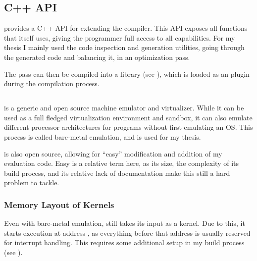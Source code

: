 


\subsection{\llvm{} C++ API}
\label{api}
\llvm{} provides a C++ API for extending the compiler.
This API exposes all functions that \llvm{} itself uses, giving the programmer full access to all capabilities.
For my thesis I mainly used the code inspection and generation utilities, going through the generated \ir{} code and balancing it, in an optimization pass.

The pass can then be compiled into a library (see ), which is loaded as an \llvm{} plugin during the compilation process.

\subsection{\qemu{}}
\label{qemu}
\qemu{} is a generic and open source machine emulator and virtualizer.\cite{bellard2005qemu}
While it can be used as a full fledged virtualization environment and sandbox, it can also emulate different processor architectures for programs without first emulating an OS.
This process is called bare-metal emulation, and is used for my thesis.

\qemu{} is also open source, allowing for ``easy'' modification and addition of my evaluation code.
Easy is a relative term here, as its size, the complexity of its build process, and its relative lack of documentation make this still a hard problem to tackle.

\subsubsection{Memory Layout of \qemu{} Kernels}
\label{memory}
Even with bare-metal emulation, \qemu{} still takes its input as a kernel.
Due to this, it starts execution at address , as everything before that address is usually reserved for interrupt handling.
This requires some additional setup in my build process (see ).


